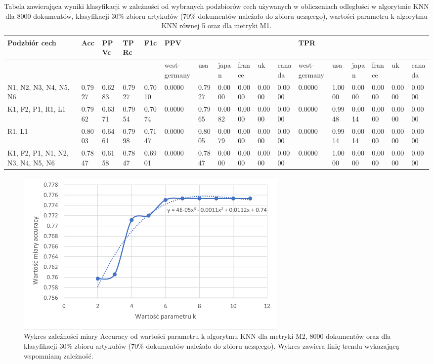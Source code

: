 \documentclass{classrep}
\begin{document}
\begin{table}[!htbp]
    \centering
\caption{Tabela zawierająca wyniki klasyfikacji w zależności od wybranych podzbiorów cech używanych w obliczeniach odległości w algorytmie KNN dla 8000 dokumentów, klasyfikacji 30\% zbioru artykułów (70\% dokumentów należało do zbioru uczącego), wartości parametru k algorytmu KNN równej 5 oraz dla metryki M1.}
\begin{adjustbox}{max width=\textwidth}
    \begin{tabular}{|l|l|l|l|l|l|l|l|l|l|l|l|l|l|l|l|l|}
    \hline
        Podzbiór cech & Acc & PPVc & TPRc & F1c & PPV & ~ & ~ & ~ & ~ & ~ & TPR & ~ & ~ & ~ & ~ & ~ \\ \hline
        ~ & ~ & ~ & ~ & ~ & west-germany  & usa  & japan & france & uk & canada & west-germany  & usa  & japan & france & uk & canada \\ \hline
        N1, N2, N3, N4, N5, N6 & 0.7927 & 0.6283 & 0.7927 & 0.7010 & 0.0000 & 0.7927 & 0.0000 & 0.0000 & 0.0000 & 0.0000 & 0.0000 & 1.0000 & 0.0000 & 0.0000 & 0.0000 & 0.0000 \\ \hline
        K1, F2, P1, R1, L1 & 0.7962 & 0.6371 & 0.7954 & 0.7074 & 0.0000 & 0.7965 & 0.0082 & 0.0000 & 0.0000 & 0.0000 & 0.0000 & 0.9948 & 0.0014 & 0.0000 & 0.0000 & 0.0000 \\ \hline
        R1, L1 & 0.8003 & 0.6461 & 0.7998 & 0.7147 & 0.0000 & 0.8005 & 0.0079 & 0.0000 & 0.0000 & 0.0000 & 0.0000 & 0.9914 & 0.0014 & 0.0000 & 0.0000 & 0.0000 \\ \hline
        K1, F2, P1, N1, N2, N3, N4, N5, N6 & 0.7847 & 0.6158 & 0.7847 & 0.6901 & 0.0000 & 0.7847 & 0.0000 & 0.0000 & 0.0000 & 0.0000 & 0.0000 & 1.0000 & 0.0000 & 0.0000 & 0.0000 & 0.0000 \\ \hline
    \end{tabular}
\end{adjustbox}
\end{table}

\begin{figure}[!htbp]
\centering
\includegraphics[width=0.66\textwidth]{wykres5.png}
\caption{Wykres zależności miary Accuracy od wartości parametru k algorytmu KNN dla metryki M2, 8000 dokumentów oraz dla klasyfikacji 30\% zbioru artykułów (70\% dokumentów należało do zbioru uczącego). Wykres zawiera linię trendu wykazającą wspomnianą zależność.}
\end{figure}
\end{document}
